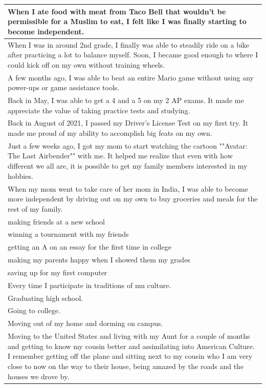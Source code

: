 \documentclass[
  .7em,
  letterpaper,
  DIV=11,
  numbers=noendperiod]{scrartcl}
\begin{document}
\begin{table}
\begin{tabular}{l}
\hline
When I ate food with meat from Taco Bell that wouldn't be permissible for a Muslim to eat, I felt like I was finally starting to become independent.\\
\hline
When I was in around 2nd grade, I finally was able to steadily ride on a bike after practicing a lot to balance myself. Soon, I became good enough to where I could kick off on my own without training wheels.\\
\hline
A few months ago, I was able to beat an entire Mario game without using any power-ups or game assistance tools.\\
\hline
Back in May, I was able to get a 4 and a 5 on my 2 AP exams. It made me appreciate the value of taking practice tests and studying.\\
\hline
Back in August of 2021, I passed my Driver's License Test on my first try. It made me proud of my ability to accomplish big feats on my own.\\
\hline
Just a few weeks ago, I got my mom to start watching the cartoon ""Avatar: The Last Airbender"" with me. It helped me realize that even with how different we all are, it is possible to get my family members interested in my hobbies.\\
\hline
When my mom went to take care of her mom in India, I was able to become more independent by driving out on my own to buy groceries and meals for the rest of my family.\\
\hline
making friends at a new school\\
\hline
winning a tournament with my friends\\
\hline
getting an A on an essay for the first time in college\\
\hline
making my parents happy when I showed them my grades\\
\hline
saving up for my first computer\\
\hline
Every time I participate in traditions of mu culture.\\
\hline
Graduating high school.\\
\hline
Going to college.\\
\hline
Moving out of my home and dorming on campus.\\
\hline
Moving to the United States and living with my Aunt for a couple of months and getting to know my cousin better and assimilating into American Culture. I remember getting off the plane and sitting next to my cousin who I am very close to now on the way to their house, being amazed by the roads and the houses we drove by.\\

\end{tabular}
\end{table}
\end{document}

